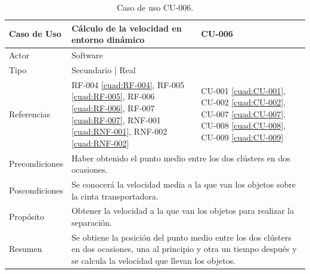 \begin{table}[H]
	\centering
	\begin{tabular}{|p{2.5cm} | p{6cm} | p{5cm} |}
		\hline
		\textbf{Caso de Uso} & Cálculo de la velocidad en entorno dinámico & \textbf{CU-006} \\
		\hline 
		Actor & \multicolumn{2}{|l|}{Software} \\
		\hline
		Tipo & \multicolumn{2}{|l|}{Secundario | Real} \\
		\hline
		Referencias & RF-004 \ref{cuad:RF-004}, RF-005 \ref{cuad:RF-005}, RF-006 \ref{cuad:RF-006}, RF-007 \ref{cuad:RF-007}, RNF-001 \ref{cuad:RNF-001}, RNF-002 \ref{cuad:RNF-002} & CU-001 \ref{cuad:CU-001}, CU-002 \ref{cuad:CU-002}, CU-007 \ref{cuad:CU-007}, CU-008 \ref{cuad:CU-008}, CU-009 \ref{cuad:CU-009} \\
		\hline
		Precondiciones & \multicolumn{2}{|l|}{\parbox{30em}{Haber obtenido el punto medio entre los dos clústers en dos ocasiones.}} \\
		\hline
		Poscondiciones & \multicolumn{2}{|l|}{\parbox{30em}{Se conocerá la velocidad media a la que van los objetos sobre la cinta transportadora.}}\\
		\hline
		Propósito & \multicolumn{2}{|l|}{\parbox{30em}{Obtener la velocidad a la que van los objetos para realizar la separación.}} \\
		\hline
		Resumen & \multicolumn{2}{|l|}{\parbox{30em}{Se obtiene la posición del punto medio entre los dos clústers en dos ocasiones, una al principio y otra un tiempo después y se calcula la velocidad que llevan los objetos.}} \\
		\hline
		
	\end{tabular}
	\caption{Caso de uso CU-006.}
	\label{cuad:CU-006}
\end{table}

